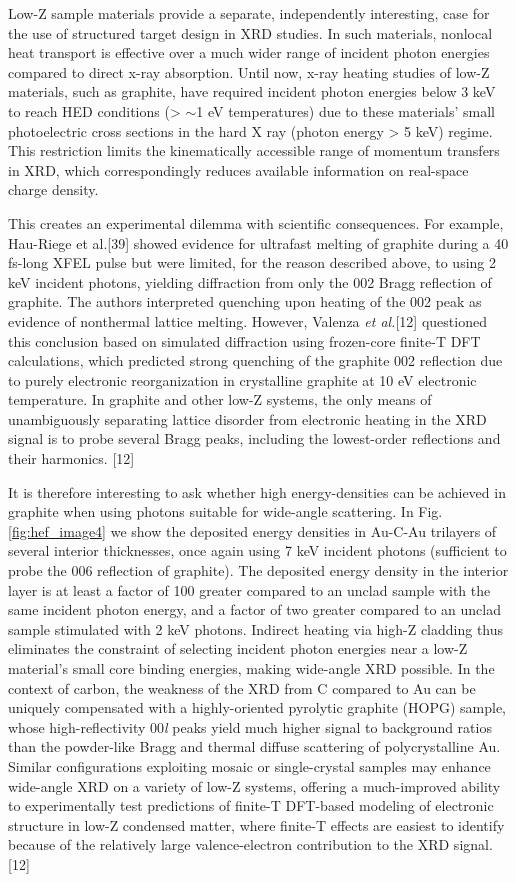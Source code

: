 Low-Z sample materials provide a separate, independently interesting,
case for the use of structured target design in XRD studies. In such
materials, nonlocal heat transport is effective over a much wider range
of incident photon energies compared to direct x-ray absorption. Until
now, x-ray heating studies of low-Z materials, such as graphite, have
required incident photon energies below 3 keV to reach HED conditions
(\textgreater{} $\sim$1 eV temperatures) due to these
materials' small photoelectric cross sections in the hard X ray (photon
energy \textgreater{} 5 keV) regime. This restriction limits the
kinematically accessible range of momentum transfers in XRD, which
correspondingly reduces available information on real-space charge
density.

This creates an experimental dilemma with scientific consequences. For
example, Hau-Riege et al.{[}39{]} showed evidence for ultrafast melting
of graphite during a 40 fs-long XFEL pulse but were limited, for the
reason described above, to using 2 keV incident photons, yielding
diffraction from only the 002 Bragg reflection of graphite. The authors
interpreted quenching upon heating of the 002 peak as evidence of
nonthermal lattice melting. However, Valenza \emph{et al.}{[}12{]}
questioned this conclusion based on simulated diffraction using
frozen-core finite-T DFT calculations, which predicted strong quenching
of the graphite 002 reflection due to purely electronic reorganization
in crystalline graphite at 10 eV electronic temperature. In graphite and
other low-Z systems, the only means of unambiguously separating lattice
disorder from electronic heating in the XRD signal is to probe several
Bragg peaks, including the lowest-order reflections and their harmonics.
{[}12{]}

It is therefore interesting to ask whether high energy-densities can be
achieved in graphite when using photons suitable for wide-angle
scattering. In Fig. \ref{fig:hef_image4} we show the deposited energy densities in Au-C-Au
trilayers of several interior thicknesses, once again using 7 keV
incident photons (sufficient to probe the 006 reflection of graphite).
The deposited energy density in the interior layer is at least a factor
of 100 greater compared to an unclad sample with the same incident
photon energy, and a factor of two greater compared to an unclad sample
stimulated with 2 keV photons. Indirect heating via high-Z cladding thus
eliminates the constraint of selecting incident photon energies near a
low-Z material's small core binding energies, making wide-angle XRD
possible. In the context of carbon, the weakness of the XRD from C
compared to Au can be uniquely compensated with a highly-oriented
pyrolytic graphite (HOPG) sample, whose high-reflectivity 00\emph{l}
peaks yield much higher signal to background ratios than the powder-like
Bragg and thermal diffuse scattering of polycrystalline Au. Similar
configurations exploiting mosaic or single-crystal samples may enhance
wide-angle XRD on a variety of low-Z systems, offering a much-improved
ability to experimentally test predictions of finite-T DFT-based
modeling of electronic structure in low-Z condensed matter, where
finite-T effects are easiest to identify because of the relatively large
valence-electron contribution to the XRD signal.{[}12{]}

